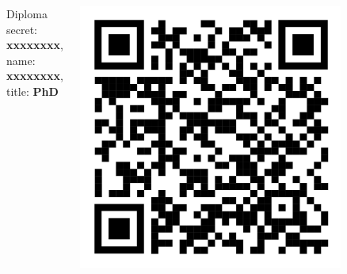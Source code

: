 \begin{frame}
  \begin{center}
  \begin{columns}[onlytextwidth]
    \hspace{1em}
  \begin{minipage}[t][3cm][t]{5cm}
    \begin{block}{Diploma}
      \vspace{0.5em}
      secret: \textbf{xxxxxxxx}, \\
      name: \textbf{xxxxxxxx}, \\
      title: \textbf{PhD}
      \vspace{0.5em}
    \end{block}
  \end{minipage}

  \vspace{2em}
  \hspace{2em}
    \includegraphics[width=0.8\textwidth]{Pictures/slideSource.png}
  \end{columns}
 

\end{center}
\end{frame}
